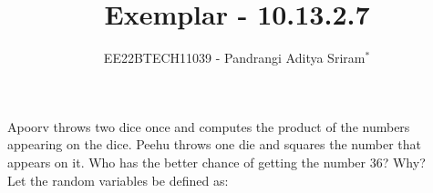 \documentclass[journal,12pt,twocolumn]{IEEEtran}
\theoremstyle{remark}
\begin{document}

\vspace{3cm}

\title{Exemplar - 10.13.2.7}
\author{EE22BTECH11039 - Pandrangi Aditya Sriram$^{*}$%
}
\maketitle
\newpage
\bigskip

\renewcommand{\thefigure}{\theenumi}
\renewcommand{\thetable}{\theenumi}

Apoorv throws two dice once and computes the product of the numbers appearing
on the dice. Peehu throws one die and squares the number that appears on it. Who
has the better chance of getting the number 36? Why?\\\solution
\fi
Let the random variables be defined as:
\begin{table}[!ht]
	
\end{table}
\end{document}
